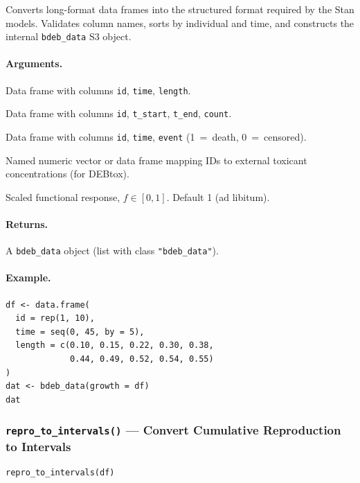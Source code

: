 \documentclass[11pt,a4paper]{article}
\newcommand{\fn}[1]{\texttt{#1()}}
\newcommand{\code}[1]{\texttt{#1}}
\begin{document}
Converts long-format data frames into the structured format required by
the Stan models.  Validates column names, sorts by individual and time,
and constructs the internal \code{bdeb\_data} S3 object.

\paragraph{Arguments.}
\begin{description}[nosep,leftmargin=3cm,style=nextline]
  \item[\code{growth}] Data frame with columns \code{id}, \code{time}, \code{length}.
  \item[\code{reproduction}] Data frame with columns \code{id}, \code{t\_start}, \code{t\_end}, \code{count}.
  \item[\code{survival}] Data frame with columns \code{id}, \code{time}, \code{event} (1~=~death, 0~=~censored).
  \item[\code{concentration}] Named numeric vector or data frame mapping IDs to external toxicant concentrations (for DEBtox).
  \item[\code{f\_food}] Scaled functional response, $f \in [0,1]$.  Default 1 (ad libitum).
\end{description}

\paragraph{Returns.} A \code{bdeb\_data} object (list with class \code{"bdeb\_data"}).

\paragraph{Example.}
\begin{lstlisting}
df <- data.frame(
  id = rep(1, 10),
  time = seq(0, 45, by = 5),
  length = c(0.10, 0.15, 0.22, 0.30, 0.38,
             0.44, 0.49, 0.52, 0.54, 0.55)
)
dat <- bdeb_data(growth = df)
dat
\end{lstlisting}

\subsubsection{\fn{repro\_to\_intervals} --- Convert Cumulative Reproduction to Intervals}

\begin{lstlisting}
repro_to_intervals(df)
\end{lstlisting}
\end{document}

